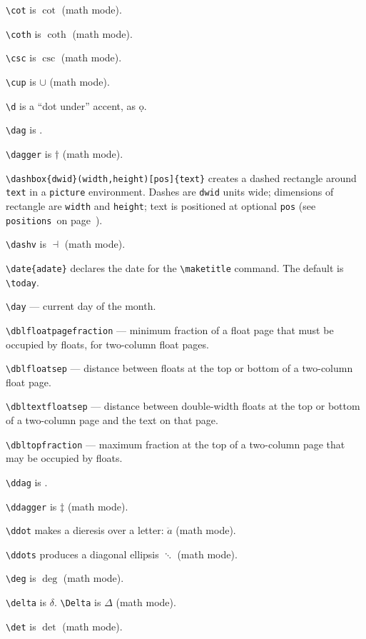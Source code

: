 \verb"\cot" is $\cot$ (math mode).

\verb"\coth" is $\coth$ (math mode).

\verb"\csc" is $\csc$ (math mode).

\verb"\cup" is $\cup$ (math mode).

\verb"\d" is a ``dot under'' accent, as \d o.

\verb"\dag" is \dag.

\verb"\dagger" is $\dagger$ (math mode).

\verb"\dashbox{dwid}(width,height)[pos]{text}" creates a dashed rectangle
	around \verb"text" in a \verb"picture" environment. Dashes are
	\verb"dwid" units wide; dimensions of rectangle are \verb"width"
	and \verb"height";  text is positioned at optional \verb"pos"
	(see \verb"positions"\ on page~\pageref{pos-ref}).

\verb"\dashv" is $\dashv$ (math mode).

\verb"\date{adate}" declares the date for the \verb"\maketitle"
	command.  The default is \verb"\today".

\verb"\day" --- current day of the month.

\verb"\dblfloatpagefraction" --- minimum fraction of a float page that must
	be occupied by floats, for two-column float pages.

\verb"\dblfloatsep" --- distance between floats at the top or bottom of a
	two-column float page.

\verb"\dbltextfloatsep" --- distance between double-width floats at the top
	or bottom of a two-column page and the text on that page.
	
\verb"\dbltopfraction" --- maximum fraction at the top of a two-column
	page that may be occupied by floats.

\verb"\ddag" is \ddag.

\verb"\ddagger" is $\ddagger$ (math mode).

\verb"\ddot" makes a dieresis over a letter: $\ddot a$ (math mode).

\verb"\ddots" produces a diagonal ellipsis $\ddots$ (math mode).

\verb"\deg" is $\deg$ (math mode).

\verb"\delta" is $\delta$. \verb"\Delta" is $\Delta$ (math mode).

\verb"\det" is $\det$ (math mode).

